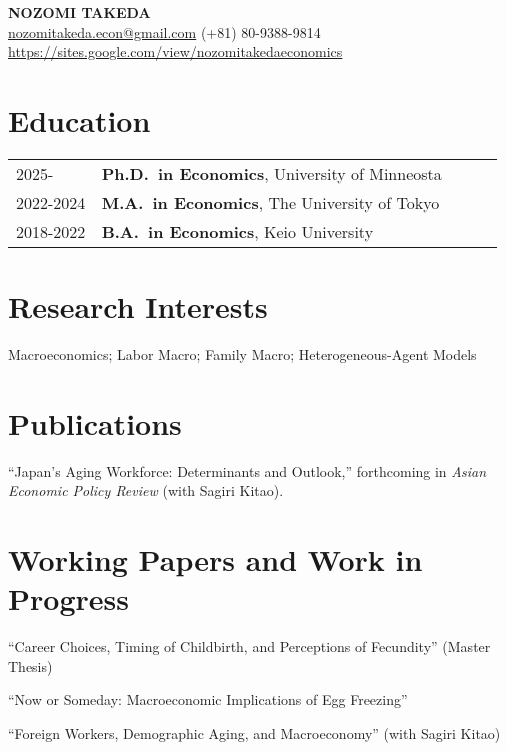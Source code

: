 \documentclass[11pt]{article}
\begin{document}
\begin{center}
    {\LARGE \bfseries NOZOMI TAKEDA}\\[4pt]
    \href{mailto:nozomitakeda.econ@gmail.com}{nozomitakeda.econ@gmail.com} (+81) 80-9388-9814\\
    \url{https://sites.google.com/view/nozomitakedaeconomics}
\end{center}
\vspace{4pt}

\section*{Education}
\begin{tabular}{p{0.17\linewidth} p{0.80\linewidth}}
2025-            & \textbf{Ph.D.\ in Economics}, University of Minneosta\\[2pt]
2022-2024        & \textbf{M.A.\ in Economics}, The University of Tokyo\\[2pt]
2018-2022        & \textbf{B.A.\ in Economics}, Keio University\\
\end{tabular}

\section*{Research Interests}
Macroeconomics; Labor Macro; Family Macro; Heterogeneous-Agent Models

\section*{Publications}
\begin{enumerate}[label={[\arabic*]}, leftmargin=*]
    \item ``Japan's Aging Workforce: Determinants and Outlook,'' forthcoming in \textit{Asian Economic Policy Review} (with Sagiri Kitao).
\end{enumerate}

\section*{Working Papers and Work in Progress}
\begin{enumerate}[label={[\arabic*]}, leftmargin=*]
    \item ``Career Choices, Timing of Childbirth, and Perceptions of Fecundity'' (Master Thesis)
    \item ``Now or Someday: Macroeconomic Implications of Egg Freezing''
    \item ``Foreign Workers, Demographic Aging, and Macroeconomy'' (with Sagiri Kitao)
\end{enumerate}
\end{document}

